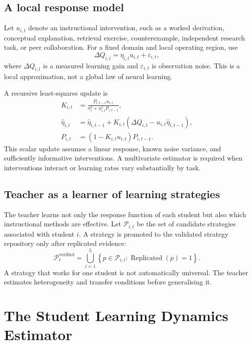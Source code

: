 \documentclass[11pt,a4paper]{article}
\begin{document}
\subsection{A local response model}

Let \(u_{i,t}\) denote an instructional intervention, such as a worked derivation, conceptual explanation, retrieval exercise, counterexample, independent research task, or peer collaboration. For a fixed domain and local operating region, use
\begin{equation}
\Delta Q_{i,t}
=
\eta_{i,t}u_{i,t}+\varepsilon_{i,t},
\end{equation}
where \(\Delta Q_{i,t}\) is a measured learning gain and \(\varepsilon_{i,t}\) is observation noise. This is a local approximation, not a global law of neural learning.

A recursive least-squares update is
\begin{align}
K_{i,t}
&=
\frac{P_{i,t-1}u_{i,t}}
{\sigma_i^2+u_{i,t}^2P_{i,t-1}},\\
\widehat{\eta}_{i,t}
&=
\widehat{\eta}_{i,t-1}
+
K_{i,t}
\left(
\Delta Q_{i,t}
-u_{i,t}\widehat{\eta}_{i,t-1}
\right),\\
P_{i,t}
&=
(1-K_{i,t}u_{i,t})P_{i,t-1}.
\end{align}
This scalar update assumes a linear response, known noise variance, and sufficiently informative interventions. A multivariate estimator is required when interventions interact or learning rates vary substantially by task.

\subsection{Teacher as a learner of learning strategies}

The teacher learns not only the response function of each student but also which instructional methods are effective. Let \(\mathcal P_{i,t}\) be the set of candidate strategies associated with student \(i\). A strategy is promoted to the validated strategy repository only after replicated evidence:
\begin{equation}
\mathcal P_t^{\mathrm{verified}}
=
\bigcup_{i=1}^{5}
\left\{
p\in\mathcal P_{i,t}:
\operatorname{Replicated}(p)=1
\right\}.
\end{equation}
A strategy that works for one student is not automatically universal. The teacher estimates heterogeneity and transfer conditions before generalising it.

\section{The Student Learning Dynamics Estimator}
\end{document}
